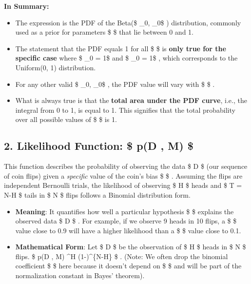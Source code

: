 \documentclass[11pt]{article}
\providecommand{\tightlist}{%
      \setlength{\itemsep}{0pt}\setlength{\parskip}{0pt}}
\begin{document}
\textbf{In Summary:}

\begin{itemize}
\tightlist
\item
  The expression is the PDF of the Beta(\$ \alpha\_0, \beta\_0\$ )
  distribution, commonly used as a prior for parameters \$ \theta\$ that
  lie between 0 and 1.
\item
  The statement that the PDF equals 1 for all \$ \theta \in [0, 1]\$ is
  \textbf{only true for the specific case} where \$ \alpha\_0 = 1\$ and
  \$ \beta\_0 = 1\$ , which corresponds to the Uniform(0, 1)
  distribution.
\item
  For any other valid \$ \alpha\_0, \beta\_0\$ , the PDF value will vary
  with \$ \theta\$ .
\item
  What is always true is that the \textbf{total area under the PDF
  curve}, i.e., the integral from 0 to 1, is equal to 1. This signifies
  that the total probability over all possible values of \$ \theta\$ is
  1.
\end{itemize}

    \subsection{\texorpdfstring{2. Likelihood Function: \$ p(D \textbar{}
\theta, M)
\$}{2. Likelihood Function: \$ p(D \textbar{} , M) \$}}\label{likelihood-function-pd-m}

This function describes the probability of observing the data \$ D \$
(our sequence of coin flips) given a \emph{specific} value of the coin's
bias \$ \theta \$ . Assuming the flips are independent Bernoulli trials,
the likelihood of observing \$ H \$ heads and \$ T = N-H \$ tails in \$
N \$ flips follows a Binomial distribution form.

\begin{itemize}
\tightlist
\item
  \textbf{Meaning}: It quantifies how well a particular hypothesis \$
  \theta \$ explains the observed data \$ D \$ . For example, if we
  observe 9 heads in 10 flips, a \$ \theta \$ value close to 0.9 will
  have a higher likelihood than a \$ \theta \$ value close to 0.1.
\item
  \textbf{Mathematical Form}: Let \$ D \$ be the observation of \$ H \$
  heads in \$ N \$ flips. \$ p(D \textbar{} \theta, M)
  \propto \theta\^{}H (1-\theta)\^{}\{N-H\} \$ . (Note: We often drop
  the binomial coefficient \$  \$ here because it doesn't
  depend on \$ \theta \$ and will be part of the normalization constant
  in Bayes' theorem).
\end{itemize}
\end{document}
